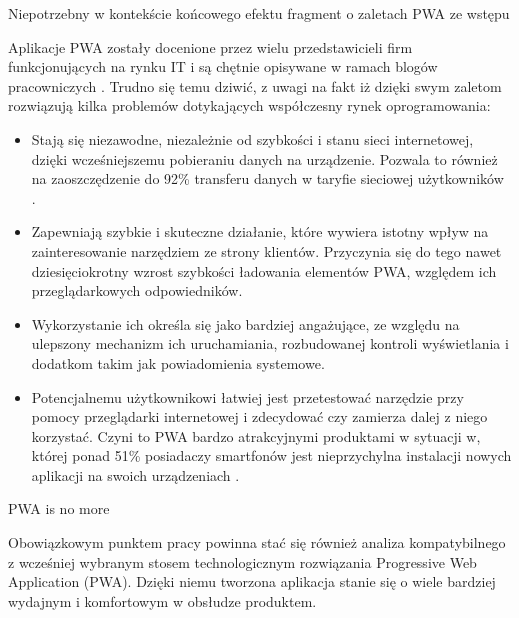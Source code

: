 Niepotrzebny w kontekście końcowego efektu fragment o zaletach PWA ze wstępu

Aplikacje PWA zostały docenione przez wielu przedstawicieli firm funkcjonujących na rynku IT i są chętnie opisywane w ramach blogów pracowniczych \cite{Moscibroda.PWA-przyszlosc-aplikacji-natywnych}. Trudno się temu dziwić, z uwagi na fakt iż dzięki swym zaletom rozwiązują kilka problemów dotykających współczesny rynek oprogramowania:

\begin{itemize}
    \item Stają się niezawodne, niezależnie od szybkości i stanu sieci internetowej, dzięki wcześniejszemu pobieraniu danych na urządzenie. Pozwala to również na zaoszczędzenie do 92\% transferu danych w taryfie sieciowej użytkowników \cite{Warcholinski.PWA-ROI}.
    \item Zapewniają szybkie i skuteczne działanie, które wywiera istotny wpływ na zainteresowanie narzędziem ze strony klientów. Przyczynia się do tego nawet dziesięciokrotny wzrost szybkości ładowania elementów PWA, względem ich przeglądarkowych odpowiedników.
    \item Wykorzystanie ich określa się jako bardziej angażujące, ze względu na ulepszony mechanizm ich uruchamiania, rozbudowanej kontroli wyświetlania i dodatkom takim jak powiadomienia systemowe.
    \item Potencjalnemu użytkownikowi łatwiej jest przetestować narzędzie przy pomocy przeglądarki internetowej i zdecydować czy zamierza dalej z niego korzystać. Czyni to PWA bardzo atrakcyjnymi produktami w sytuacji w, której ponad 51\% posiadaczy smartfonów jest nieprzychylna instalacji nowych aplikacji na swoich urządzeniach \cite{Warcholinski.PWA-ROI}.
\end{itemize}

PWA is no more

    \item Obowiązkowym punktem pracy powinna stać się również analiza kompatybilnego z wcześniej wybranym stosem technologicznym rozwiązania Progressive Web Application (PWA). Dzięki niemu tworzona aplikacja stanie się o wiele bardziej wydajnym i komfortowym w obsłudze produktem.

